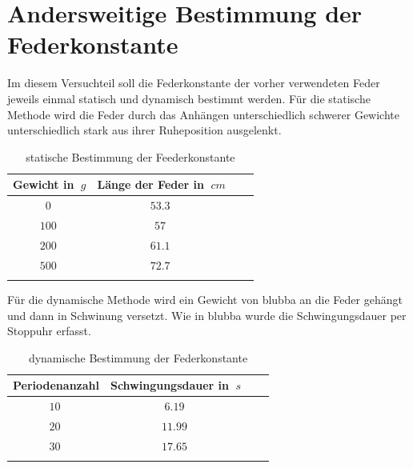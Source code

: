 \section{Andersweitige Bestimmung der Federkonstante}

Im diesem Versuchteil soll die Federkonstante der vorher verwendeten Feder jeweils einmal statisch und dynamisch bestimmt werden.
Für die statische Methode wird die Feder durch das Anhängen unterschiedlich schwerer Gewichte unterschiedlich stark aus ihrer Ruheposition ausgelenkt.

\begin{table}[h!]
    \begin{center}
        \caption{statische Bestimmung der Feederkonstante}
        \begin{tabular}{cccc}
            \hline
            Gewicht in $\SI{}{g}$ & Länge der Feder in $\SI{}{cm}$ \\
            \hline
            $\SI{0}{}$ & $\SI{53,3}{}$  \\
            $\SI{100}{}$ & $\SI{57}{}$ \\
            $\SI{200}{}$ & $\SI{61,1}{}$ \\
            $\SI{500}{}$ & $\SI{72,7}{}$ \\
            \hline
            \label{tab:Feder-statisch-Messwerte}
        \end{tabular}
    \end{center}
\end{table}

Für die dynamische Methode wird ein Gewicht von blubba an die Feder gehängt und dann in Schwinung versetzt. Wie in blubba wurde die Schwingungsdauer per Stoppuhr erfasst.

\begin{table}[h!]
    \begin{center}
        \caption{dynamische Bestimmung der Federkonstante}
        \begin{tabular}{cccc}
            \hline
            Periodenanzahl & Schwingungsdauer in $\SI{}{s}$ \\
            \hline
            $\SI{10}{}$ & $\SI{6.19}{}$  \\
            $\SI{20}{}$ & $\SI{11.99}{}$  \\
            $\SI{30}{}$ & $\SI{17.65}{}$  \\
            
            \hline
            \label{tab:Feder-dynamisch-Messwerte}
        \end{tabular}
    \end{center}
\end{table}



